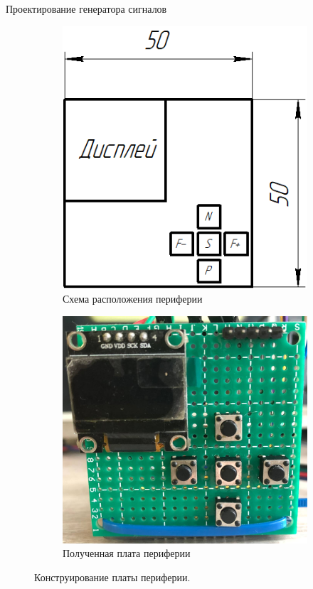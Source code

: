 \documentclass[10pt]{beamer}
\begin{document}
\begin{frame}{Проектирование генератора сигналов}
\begin{figure}
     \begin{subfigure}[H]{0.45\textwidth}
         \centering
         \includegraphics[width=\textwidth]{func_gen}
         \caption{Схема расположения периферии}
     \end{subfigure}
     \hfill
     \begin{subfigure}[H]{0.5\textwidth}
         \centering
         \includegraphics[width=\textwidth]{m1}
         \caption{Полученная плата периферии}
     \end{subfigure}
        \caption{Конструирование платы периферии.}
\end{figure}
\end{frame}
\end{document}
